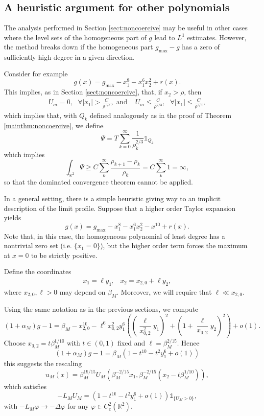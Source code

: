\documentclass[10pt,a4paper]{article}
\newcommand{\gmax}{g_{\mathrm{max}}}
\newcommand{\RR}{\mathbb{R}}
\newcommand{\faskip}{\hspace{8pt}}
\numberwithin{equation}{section}
\begin{document}
\subsection{A heuristic argument for other polynomials}

The analysis performed in Section \ref{sect:noncoercive} may be useful in other cases where the level sets of the homogeneous part of $ g $ lead to $ L^1 $ estimates. However, the method breaks down if the homogeneous part $ \gmax - g $ has a zero of sufficiently high degree in a given direction. 

Consider for example
\[g(x) = \gmax - x_1^8 - x_1^6 x_2^2 + r(x).\]
This implies, as in Section \ref{sect:noncoercive}, that, if $ x_2 > \rho $, then 
\[
	\begin{array}{cc}	
		U_m = 0, \faskip \forall |x_1|>\frac{C}{\rho^{1/3}}, \text{ and } & U_m \leq \frac{C}{\rho^{2/3}}, \faskip \forall |x_1| \leq \frac{C}{\rho^{1/3}},
	\end{array}
\]
which implies that, with $ Q_k $ defined analogously as in the proof of Theorem \ref{mainthm:noncoercive}, we define
\[\Psi = T \sum_{k=0}^{\infty} \frac{1}{\rho_k^{2/3}} \mathbb{1}_{Q_k}\]
which implies 
\[
	\int_{\RR^{2}} \Psi \geq C \sum_{k}^{\infty} \frac{\rho_{k+1} - \rho_k}{\rho_k} = C \sum_{k}^{\infty} 1 = \infty,
\]
so that the dominated convergence theorem cannot be applied.

In a general setting, there is a simple heuristic giving way to an implicit description of the limit profile. Suppose that a higher order Taylor expansion yields
\[g(x) = \gmax - x_1^8 - x_1^6 x_2^2 - x^{10} + r(x).\]
Note that, in this case, the homogeneous polynomial of least degree has a nontrivial zero set (i.e. $ \{x_1 = 0\} $), but the higher order term forces the maximum at $ x=0 $ to be strictly positive.

Define the coordinates
\[
	\begin{array}{cc}
		x_1 = \ell y_1, & x_2 = x_{2,0} + \ell y_2,		
	\end{array}
\]
where $ x_{2,0}, \ell > 0 $ may depend on $ \beta_{M} $. Moreover, we will require that $ \ell \ll x_{2, 0} $. 

Using the same notation as in the previous sections, we compute
\[
	(1 + \alpha_M)g - 1 = \beta_M - x_{2,0}^{10} -\ell^{6} x_{0,2}^{2} y_1^6 \left( \left(\frac{\ell}{x_{0,2}^2} y_1 \right)^2+ \left( 1 + \frac{\ell}{x_{0,2}} y_2 \right)^2 \right) + o(1).
\]
Choose $ x_{0,2} = t \beta_{M}^{1/10} $ with $ t \in (0,1) $ fixed and $ \ell = \beta_M^{2/15} $. Hence
\[
	(1 + \alpha_M)g - 1 = \beta_M \left( 1 - t^{10} - t^{2}y_1^6  + o(1) \right) 
\]
this suggests the rescaling
\[
	u_M(x) = \beta_M^{19/15} U_M(\beta_M^{-2/15} x_1, \beta_M^{-2/15}(x_2 - t\beta_M^{1/10})),
\]
which satisfies
\[
	-L_M U_M = \left( 1 - t^{10} - t^2y_1^6 +o(1) \right)\mathbb{1}_{\{U_M > 0\}},
\]
with $ -L_M\varphi \rightarrow -\Delta \varphi $ for any $ \varphi \in C^{2}_c(\RR^2) $. 
\end{document}
